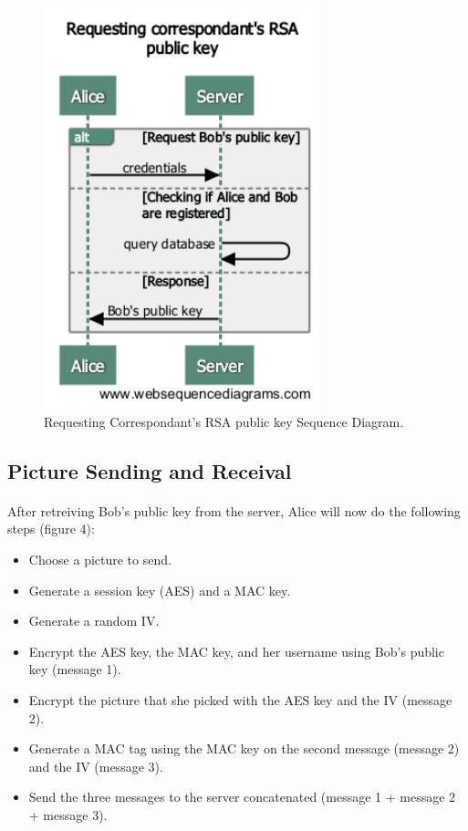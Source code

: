 	    \begin{figure}[H]
	    
	      \centering
	      \includegraphics[width=8cm]{images/architecture/requestingcorrespondant'sRSApublickey}
	      
	      \caption{Requesting Correspondant's RSA public key Sequence Diagram.}
	      \label{Figure 3}
	     
	    \end{figure}
	    
	    
	    \subsection{Picture Sending and Receival}
	    
	    \paragraph{}
	    
	    After retreiving Bob's public key from the server, Alice will now do the following steps (figure 4):
	    
	    \begin{itemize}
	     \item Choose a picture to send.
	     \item Generate a session key (AES) and a MAC key.
	     \item Generate a random IV.
	     \item Encrypt the AES key, the MAC key, and her username using Bob's public key (message 1).
	     \item Encrypt the picture that she picked with the AES key and the IV (message 2).
	     \item Generate a MAC tag using the MAC key on the second message (message 2) and the IV (message 3).
	     \item Send the three messages to the server concatenated (message 1 + message 2 + message 3).
	    \end{itemize}
	    
